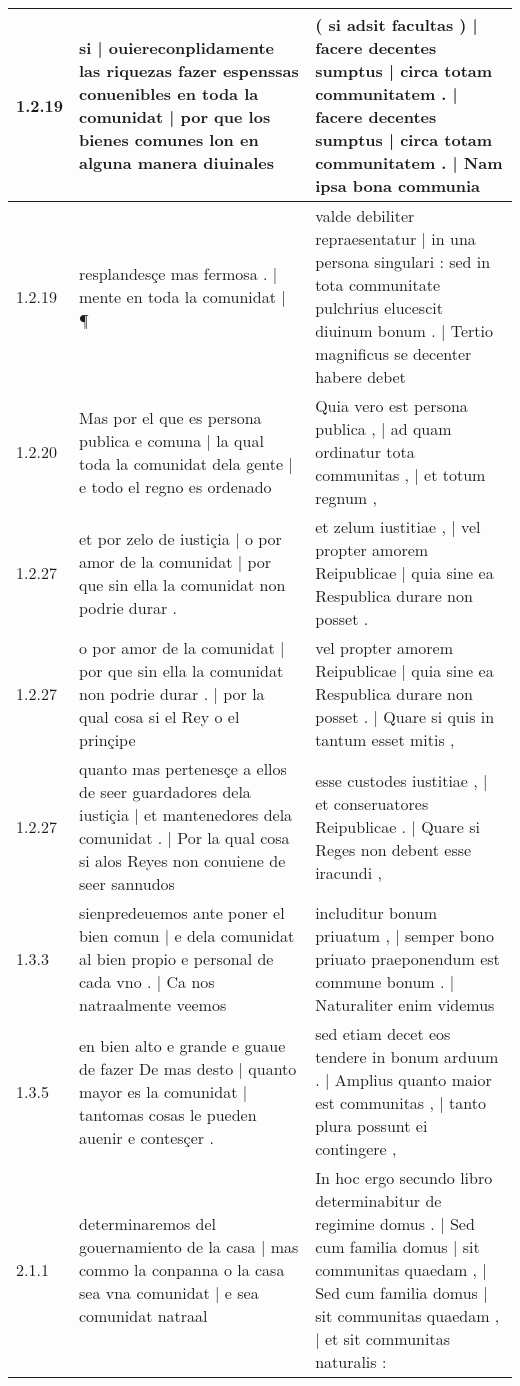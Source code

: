 \begin{tabular}{|p{1cm}|p{6.5cm}|p{6.5cm}|}
1.2.19 & si | ouiereconplidamente las riquezas fazer espenssas conuenibles en toda la comunidat | por que los bienes comunes lon en alguna manera diuinales & ( si adsit facultas ) | facere decentes sumptus | circa totam communitatem . | facere decentes sumptus | circa totam communitatem . | Nam ipsa bona communia \\\hline
1.2.19 & resplandesçe mas fermosa . | mente en toda la comunidat | ¶ & valde debiliter repraesentatur | in una persona singulari : sed in tota communitate pulchrius elucescit diuinum bonum . | Tertio magnificus se decenter habere debet \\\hline
1.2.20 & Mas por el que es persona publica e comuna | la qual toda la comunidat dela gente | e todo el regno es ordenado & Quia vero est persona publica , | ad quam ordinatur tota communitas , | et totum regnum , \\\hline
1.2.27 & et por zelo de iustiçia | o por amor de la comunidat | por que sin ella la comunidat non podrie durar . & et zelum iustitiae , | vel propter amorem Reipublicae | quia sine ea Respublica durare non posset . \\\hline
1.2.27 & o por amor de la comunidat | por que sin ella la comunidat non podrie durar . | por la qual cosa si el Rey o el prinçipe & vel propter amorem Reipublicae | quia sine ea Respublica durare non posset . | Quare si quis in tantum esset mitis , \\\hline
1.2.27 & quanto mas pertenesçe a ellos de seer guardadores dela iustiçia | et mantenedores dela comunidat . | Por la qual cosa si alos Reyes non conuiene de seer sannudos & esse custodes iustitiae , | et conseruatores Reipublicae . | Quare si Reges non debent esse iracundi , \\\hline
1.3.3 & sienpredeuemos ante poner el bien comun | e dela comunidat al bien propio e personal de cada vno . | Ca nos natraalmente veemos & includitur bonum priuatum , | semper bono priuato praeponendum est commune bonum . | Naturaliter enim videmus \\\hline
1.3.5 & en bien alto e grande e guaue de fazer De mas desto | quanto mayor es la comunidat | tantomas cosas le pueden auenir e contesçer . & sed etiam decet eos tendere in bonum arduum . | Amplius quanto maior est communitas , | tanto plura possunt ei contingere , \\\hline
2.1.1 & determinaremos del gouernamiento de la casa | mas commo la conpanna o la casa sea vna comunidat | e sea comunidat natraal & In hoc ergo secundo libro determinabitur de regimine domus . | Sed cum familia domus | sit communitas quaedam , | Sed cum familia domus | sit communitas quaedam , | et sit communitas naturalis : \\\hline

\end{tabular}
